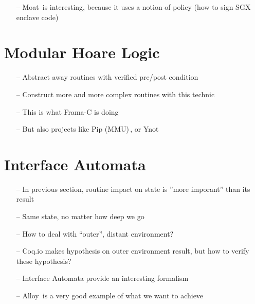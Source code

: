 \begin{itemize}
\item[--] Moat\,\cite{sinha2015moat} is interesting, because it uses a notion of
  policy (how to sign SGX enclave code)
\end{itemize}

\section{Modular Hoare Logic} %

\begin{itemize}
\item[--] Abstract away routines with verified pre/post condition
\item[--] Construct more and more complex routines with this technic
\item[--] This is what Frama-C is doing
\item[--] But also projects like Pip (MMU)\,\cite{jomaa2016mmu}, or Ynot
\end{itemize}

\section{Interface Automata} %

\begin{itemize}
\item[--] In previous section, routine impact on state is ''more imporant'' than
  its result
\item[--] Same state, no matter how deep we go
\item[--] How to deal with ``outer'', distant environment?
\item[--] Coq.io makes hypothesis on outer environment result, but how to verify
  these hypothesis?
\item[--] Interface Automata provide an interesting formalism
\item[--] Alloy\,\cite{jackson2012alloy} is a very good example of what we want
  to achieve
\end{itemize}

